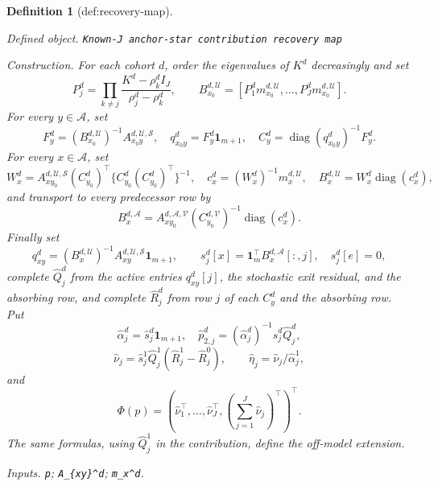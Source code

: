 \documentclass{article}
\newtheorem{definition}{Definition}
\begin{document}
\begin{definition}[def:recovery-map]\label{def:recovery-map}
\par\smallskip\noindent\emph{Defined object.} \texttt{Known-\allowbreak{}J anchor-\allowbreak{}star contribution recovery map}
\par\smallskip\noindent\emph{Construction.} For each cohort \(d\), order the eigenvalues of \(K^d\) decreasingly and set
\[
 P_j^d=\prod_{k\neq j}\frac{K^d-\rho_k^d I_J}{\rho_j^d-\rho_k^d},
 \qquad
 B_{x_0}^{d,\mathcal U}=[P_1^dm_{x_0}^{d,\mathcal U},\ldots,P_J^dm_{x_0}^{d,\mathcal U}].
\]
For every \(y\in\mathcal A\), set
\[
 F_y^d=(B_{x_0}^{d,\mathcal U})^{-1}A_{x_0y}^{d,\mathcal U,\mathcal S},\quad
 q_{x_0y}^d=F_y^d\mathbf 1_{m+1},\quad
 C_y^d=\operatorname{diag}(q_{x_0y}^d)^{-1}F_y^d.
\]
For every \(x\in\mathcal A\), set
\[
 W_x^d=A_{xy_0}^{d,\mathcal U,\mathcal S}(C_{y_0}^d)^\top
 \{C_{y_0}^d(C_{y_0}^d)^\top\}^{-1},\quad
 c_x^d=(W_x^d)^{-1}m_x^{d,\mathcal U},\quad
 B_x^{d,\mathcal U}=W_x^d\operatorname{diag}(c_x^d),
\]
and transport to every predecessor row by
\[
 B_x^{d,\mathcal A}=A_{xy_0}^{d,\mathcal A,\mathcal V}
 (C_{y_0}^{d,\mathcal V})^{-1}\operatorname{diag}(c_x^d).
\]
Finally set
\[
 q_{xy}^d=(B_x^{d,\mathcal U})^{-1}A_{xy}^{d,\mathcal U,\mathcal S}\mathbf 1_{m+1},
 \qquad s_j^d[x]=\mathbf 1_m^\top B_x^{d,\mathcal A}[:,j],\quad s_j^d[e]=0,
\]
complete \(\widehat Q_j^d\) from the active entries \(q_{xy}^d[j]\), the stochastic exit residual, and the absorbing row, and complete \(\widehat R_j^d\) from row \(j\) of each \(C_y^d\) and the absorbing row. Put
\[
 \widehat\alpha_j^d=\widehat s_j^d\mathbf 1_{m+1},\quad
 \widehat p_{2,j}^d=(\widehat\alpha_j^d)^{-1}\widehat s_j^d\widehat Q_j^d,
\]
\[
 \widehat\nu_j=\widehat s_j^1\widehat Q_j^1(\widehat R_j^1-\widehat R_j^0),
 \qquad \widehat\eta_j=\widehat\nu_j/\widehat\alpha_j^1,
\]
and
\[
 \Phi(p)=(\widehat\nu_1^\top,\ldots,\widehat\nu_J^\top,
 (\sum_{j=1}^J\widehat\nu_j)^\top)^\top.
\]
The same formulas, using \(\widehat Q_j^1\) in the contribution, define the off-model extension.
\par\smallskip\noindent\emph{Inputs.} \texttt{p}; \texttt{A\_\allowbreak{}\{xy\}\allowbreak{}\textasciicircum{}d}; \texttt{m\_\allowbreak{}x\textasciicircum{}d}.
\end{definition}
\end{document}
